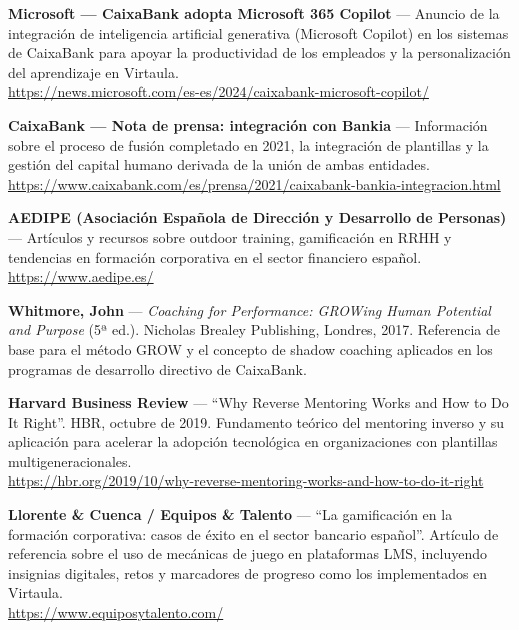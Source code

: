 \begin{enumerate}[label={[\arabic*]}, resume]
  \item \textbf{Microsoft --- CaixaBank adopta Microsoft 365 Copilot} --- Anuncio de la integración
        de inteligencia artificial generativa (Microsoft Copilot) en los sistemas de CaixaBank
        para apoyar la productividad de los empleados y la personalización del aprendizaje en
        Virtaula.\\
        \url{https://news.microsoft.com/es-es/2024/caixabank-microsoft-copilot/}

  \item \textbf{CaixaBank --- Nota de prensa: integración con Bankia} --- Información sobre el
        proceso de fusión completado en 2021, la integración de plantillas y la gestión del
        capital humano derivada de la unión de ambas entidades.\\
        \url{https://www.caixabank.com/es/prensa/2021/caixabank-bankia-integracion.html}

  \item \textbf{AEDIPE (Asociación Española de Dirección y Desarrollo de Personas)} ---
        Artículos y recursos sobre outdoor training, gamificación en RRHH y tendencias en
        formación corporativa en el sector financiero español.\\
        \url{https://www.aedipe.es/}

  \item \textbf{Whitmore, John} --- \textit{Coaching for Performance: GROWing Human Potential and
        Purpose} (5ª ed.). Nicholas Brealey Publishing, Londres, 2017. Referencia de base para el
        método GROW y el concepto de shadow coaching aplicados en los programas de desarrollo
        directivo de CaixaBank.

  \item \textbf{Harvard Business Review} --- ``Why Reverse Mentoring Works and How to Do It
        Right''. HBR, octubre de 2019. Fundamento teórico del mentoring inverso y su aplicación
        para acelerar la adopción tecnológica en organizaciones con plantillas multigeneracionales.\\
        \url{https://hbr.org/2019/10/why-reverse-mentoring-works-and-how-to-do-it-right}

  \item \textbf{Llorente \& Cuenca / Equipos \& Talento} --- ``La gamificación en la formación
        corporativa: casos de éxito en el sector bancario español''. Artículo de referencia sobre
        el uso de mecánicas de juego en plataformas LMS, incluyendo insignias digitales, retos
        y marcadores de progreso como los implementados en Virtaula.\\
        \url{https://www.equiposytalento.com/}


\end{enumerate}
